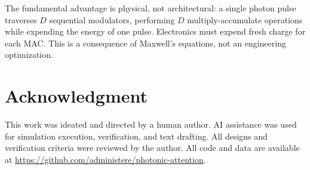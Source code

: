 \documentclass[conference]{IEEEtran}
\begin{document}
The fundamental advantage is physical, not architectural: a single
photon pulse traverses $D$ sequential modulators, performing $D$
multiply-accumulate operations while expending the energy of one pulse.
Electronics must expend fresh charge for each MAC. This is a
consequence of Maxwell's equations, not an engineering optimization.

\section*{Acknowledgment}

This work was ideated and directed by a human author. AI assistance
was used for simulation execution, verification, and text drafting.
All designs and verification criteria were reviewed by the author.
All code and data are available at
\url{https://github.com/administere/photonic-attention}.



\end{document}
